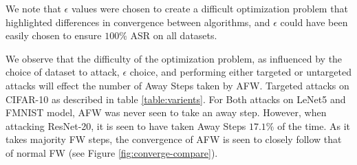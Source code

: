 \documentclass{article}
\begin{document}
\begin{table}[H]
    \centering
    \caption{Attack Success Rate (ASR) and Average Iterations of Frank-Wolfe Algorithm and Variants for Targeted Adversarial Attacks on 1000 Examples from Three Datasets with $20$ maximum iterations and decaying step-size rule.}
	\label{table:varients}
\end{table}
We note that $\epsilon$ values were chosen to create a difficult optimization problem that highlighted differences in convergence between algorithms, and $\epsilon$ could have been easily chosen to ensure $100\%$ ASR on all datasets.

We observe that the difficulty of the optimization problem, as influenced by the choice of dataset to attack, $\epsilon$ choice, and performing either targeted or untargeted attacks will effect the number of Away Steps taken by AFW. Targeted attacks on CIFAR-10 as described in table \ref{table:varients}. For Both attacks on LeNet5 and FMNIST model, AFW was never seen to take an away step. However, when attacking ResNet-20, it is seen to have taken Away Steps $17.1\%$ of the time. As it takes majority FW steps, the convergence of AFW is seen to closely follow that of normal FW (see Figure \ref{fig:converge-compare}).
\end{document}
